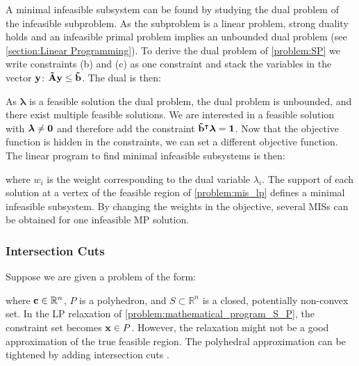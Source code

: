 A minimal infeasible subsystem can be found by studying the dual problem of the infeasible subproblem. As the subproblem is a linear problem, strong duality holds and an infeasible primal problem implies an unbounded dual problem (see \cref{section:Linear Programming}).
To derive the dual problem of \cref{problem:SP} we write constraints (b) and (c) as one constraint and stack the variables in the vector $\bold y$: $\bold{\tilde A} \bold y \leq \bold{\tilde b}$. The dual is then:

As $\boldsymbol \lambda$ is a feasible solution the dual problem, the dual problem is unbounded, and there exist multiple feasible solutions. We are interested in a feasible solution with $\boldsymbol \lambda \neq \bold 0$ and therefore add the constraint $\bold{\tilde b}^\intercal \boldsymbol \lambda = \bold 1$. Now that the objective function is hidden in the constraints, we can set a different objective function.
The linear program to find minimal infeasible subsystems is then:
\quad where $w_i$ is the weight corresponding to the dual variable $\lambda_i$. The support of each solution at a vertex of the feasible region of \cref{problem:mis_lp}  defines a minimal infeasible subsystem. By changing the weights in the objective, several MISs can be obtained for one infeasible MP solution. 


\subsubsection{Intersection Cuts} \label{section:optimization_intersection_cuts}

Suppose we are given a problem of the form:
\quad where $\bold c \in \mathbb{R}^n$, $P$ is a polyhedron, and $S \subset \mathbb{R}^n$ is a closed, potentially non-convex set.
In the LP relaxation of \cref{problem:mathematical_program_S_P}, the constraint set becomes $\bold x \in P$. However, the relaxation might not be a good approximation of the true feasible region. The polyhedral approximation 
can be tightened by adding intersection cuts \cite{bienstock_outer_product_free_sets}. 

